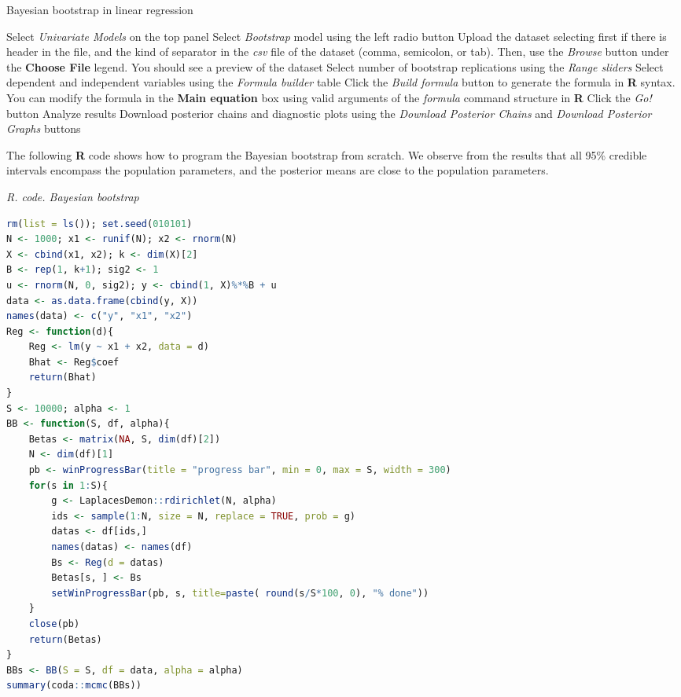 \begin{algorithm}[h!]
	\caption{Bayesian bootstrap in linear regression}\label{alg:BayBootstrap}
	\begin{algorithmic}[1]  		 			
		\State Select \textit{Univariate Models} on the top panel
		\State Select \textit{Bootstrap} model using the left radio button
		\State Upload the dataset selecting first if there is header in the file, and the kind of separator in the \textit{csv} file of the dataset (comma, semicolon, or tab). Then, use the \textit{Browse} button under the \textbf{Choose File} legend. You should see a preview of the dataset
		\State Select number of bootstrap replications using the \textit{Range sliders}
		\State Select dependent and independent variables using the \textit{Formula builder} table
		\State Click the \textit{Build formula} button to generate the formula in \textbf{R} syntax. You can modify the formula in the \textbf{Main equation} box using valid arguments of the \textit{formula} command structure in \textbf{R}
		\State Click the \textit{Go!} button
		\State Analyze results
		\State Download posterior chains and diagnostic plots using the \textit{Download Posterior Chains} and \textit{Download Posterior Graphs} buttons
	\end{algorithmic} 
\end{algorithm}

The following \textbf{R} code shows how to program the Bayesian bootstrap from scratch. We observe from the results that all 95\% credible intervals encompass the population parameters, and the posterior means are close to the population parameters.

\begin{tcolorbox}[enhanced,width=4.67in,center upper,
	fontupper=\large\bfseries,drop shadow southwest,sharp corners]
	\textit{R. code. Bayesian bootstrap}
	\begin{VF}
		\begin{lstlisting}[language=R]
rm(list = ls()); set.seed(010101)
N <- 1000; x1 <- runif(N); x2 <- rnorm(N)
X <- cbind(x1, x2); k <- dim(X)[2]
B <- rep(1, k+1); sig2 <- 1
u <- rnorm(N, 0, sig2); y <- cbind(1, X)%*%B + u
data <- as.data.frame(cbind(y, X))
names(data) <- c("y", "x1", "x2")
Reg <- function(d){
	Reg <- lm(y ~ x1 + x2, data = d)
	Bhat <- Reg$coef
	return(Bhat)
}
S <- 10000; alpha <- 1
BB <- function(S, df, alpha){
	Betas <- matrix(NA, S, dim(df)[2])
	N <- dim(df)[1]
	pb <- winProgressBar(title = "progress bar", min = 0, max = S, width = 300)
	for(s in 1:S){
		g <- LaplacesDemon::rdirichlet(N, alpha)
		ids <- sample(1:N, size = N, replace = TRUE, prob = g)
		datas <- df[ids,]
		names(datas) <- names(df)
		Bs <- Reg(d = datas)
		Betas[s, ] <- Bs
		setWinProgressBar(pb, s, title=paste( round(s/S*100, 0), "% done"))
	}
	close(pb)
	return(Betas)
}
BBs <- BB(S = S, df = data, alpha = alpha)
summary(coda::mcmc(BBs))
\end{lstlisting}
	\end{VF}
\end{tcolorbox} 
 
